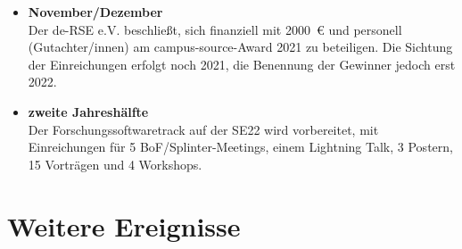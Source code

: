\begin{itemize}
 \item \textbf{November/Dezember}\\Der de-RSE e.V. beschließt, sich finanziell mit 2000\ € und personell (Gutachter/innen) am campus-source-Award 2021 zu beteiligen. Die Sichtung der Einreichungen erfolgt noch 2021, die Benennung der Gewinner jedoch erst 2022.
 \item \textbf{zweite Jahreshälfte}\\Der Forschungssoftwaretrack auf der SE22 wird vorbereitet, mit Einreichungen für 5 BoF/Splinter-Meetings, einem Lightning Talk, 3 Postern, 15 Vorträgen und 4 Workshops.
\end{itemize}

\section{Weitere Ereignisse}

